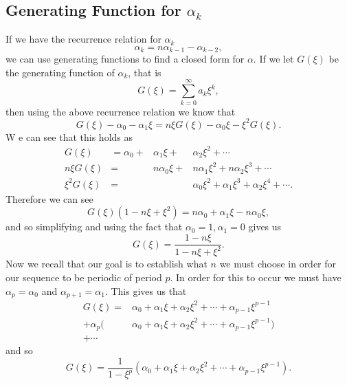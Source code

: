 \documentclass[12pt]{article}
\begin{document}
\subsection{Generating Function for $\alpha_k$}
If we have the recurrence relation for $\alpha_k$ 
\begin{equation*}
\alpha_k = n \alpha_{k-1} - \alpha_{k-2}, 
\end{equation*}
we can use generating functions to find a closed form for $\alpha$. If we let $G(\xi)$ be the generating function of $\alpha_k$, that is 
\begin{equation*}
G(\xi) = \sum_{k=0}^{\infty} a_k \xi^k,
\end{equation*}
then using the above recurrence relation we know that 
\begin{equation*}
G(\xi) -\alpha_0 - \alpha_1 \xi = n \xi G(\xi) - \alpha_0 \xi - \xi^2 G(\xi).
\end{equation*}
W e can see that this holds as 
\begin{align*}
G(\xi) &= \alpha_0 + &\alpha_1 \xi + &\alpha_2 \xi^2 + \cdots \\
n \xi G(\xi) &= &n\alpha_0 \xi + &n\alpha_1 \xi^2 + n\alpha_2 \xi^3 + \cdots \\
\xi^2 G(\xi) &= &&\alpha_0 \xi^2 + \alpha_1 \xi^3 + \alpha_2 \xi^4 + \cdots.
\end{align*}
Therefore we can see 
\begin{equation*}
G( \xi) (1-n \xi + \xi^2) = n\alpha_0 + \alpha_1 \xi - n\alpha_0 \xi,
\end{equation*}
and so simplifying and using the fact that $\alpha_0=1, \alpha_1=0$ gives us 
\begin{equation*}
G(\xi) = \frac{ 1 - n\xi}{1 - n \xi + \xi^2} .
\end{equation*}
Now we recall that our goal is to establish what $n$ we must choose in order for our sequence to be periodic of period $p$. In order for this to occur we must have $\alpha_p= \alpha_0$ and $\alpha_{p+1} = \alpha_1$. This gives us that 
\begin{align*}
G(\xi) = &\alpha_0 + \alpha_1 \xi + \alpha_2 \xi^2 + \cdots + \alpha_{p-1} \xi^{p-1} \\
+ \alpha_p(&\alpha_0 + \alpha_1 \xi + \alpha_2 \xi^2 + \cdots + \alpha_{p-1} \xi^{p-1}) \\ 
+ \cdots 
\end{align*}
and so 
\begin{equation*}
G(\xi) = \frac{1}{1- \xi^p} (\alpha_0 + \alpha_1 \xi + \alpha_2 \xi^2 + \cdots + \alpha_{p-1} \xi^{p-1}).
\end{equation*}
\end{document}
